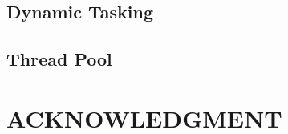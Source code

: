 \documentclass[sigconf]{acmart}
\begin{document}
\subsection{Dynamic Tasking}


\subsection{Thread Pool}


\section{ACKNOWLEDGMENT}




%
%


\end{document}
